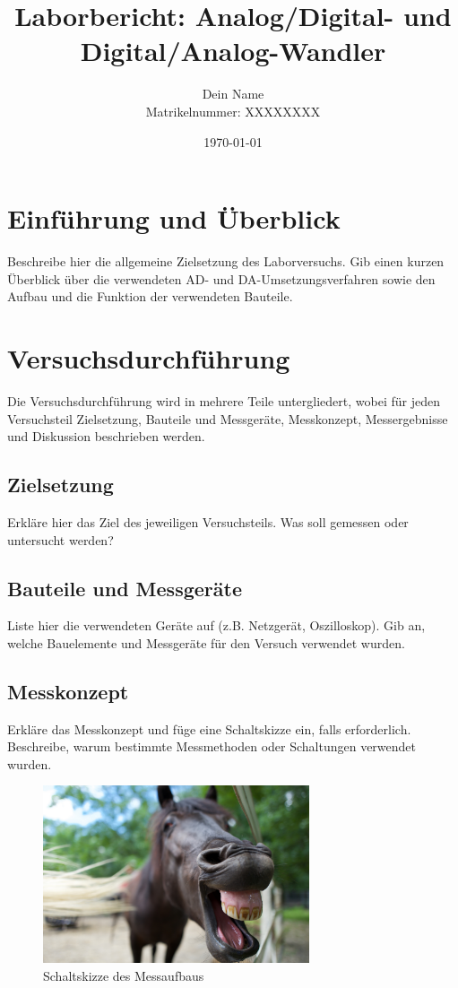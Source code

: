 \documentclass[a4paper,12pt]{article}
\title{Laborbericht: Analog/Digital- und Digital/Analog-Wandler}
\author{Dein Name \\ Matrikelnummer: XXXXXXXX}
\date{\today}
\begin{document}
\maketitle

\tableofcontents
\newpage

\section{Einführung und Überblick}
Beschreibe hier die allgemeine Zielsetzung des Laborversuchs. Gib einen kurzen Überblick über die verwendeten AD- und DA-Umsetzungsverfahren sowie den Aufbau und die Funktion der verwendeten Bauteile.

\section{Versuchsdurchführung}
Die Versuchsdurchführung wird in mehrere Teile untergliedert, wobei für jeden Versuchsteil Zielsetzung, Bauteile und Messgeräte, Messkonzept, Messergebnisse und Diskussion beschrieben werden. 

\subsection{Zielsetzung}
Erkläre hier das Ziel des jeweiligen Versuchsteils. Was soll gemessen oder untersucht werden?

\subsection{Bauteile und Messgeräte}
Liste hier die verwendeten Geräte auf (z.B. Netzgerät, Oszilloskop). Gib an, welche Bauelemente und Messgeräte für den Versuch verwendet wurden.

\subsection{Messkonzept}
Erkläre das Messkonzept und füge eine Schaltskizze ein, falls erforderlich. Beschreibe, warum bestimmte Messmethoden oder Schaltungen verwendet wurden.

\begin{figure}[H]
    \centering
    \includegraphics[width=0.7\textwidth]{Schaltskizze.jpg} %
    \caption{Schaltskizze des Messaufbaus}
\end{figure}
\end{document}
